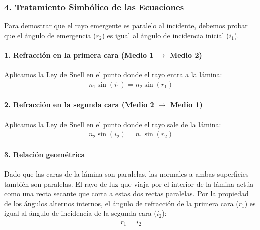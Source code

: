 \subsubsection*{4. Tratamiento Simbólico de las Ecuaciones}
Para demostrar que el rayo emergente es paralelo al incidente, debemos probar que el ángulo de emergencia ($r_2$) es igual al ángulo de incidencia inicial ($i_1$).

\paragraph*{1. Refracción en la primera cara (Medio 1 $\to$ Medio 2)}
Aplicamos la Ley de Snell en el punto donde el rayo entra a la lámina:
\begin{gather}
    n_1 \sin(i_1) = n_2 \sin(r_1) \label{eq:snell1}
\end{gather}

\paragraph*{2. Refracción en la segunda cara (Medio 2 $\to$ Medio 1)}
Aplicamos la Ley de Snell en el punto donde el rayo sale de la lámina:
\begin{gather}
    n_2 \sin(i_2) = n_1 \sin(r_2) \label{eq:snell2}
\end{gather}

\paragraph*{3. Relación geométrica}
Dado que las caras de la lámina son paralelas, las normales a ambas superficies también son paralelas. El rayo de luz que viaja por el interior de la lámina actúa como una recta secante que corta a estas dos rectas paralelas. Por la propiedad de los ángulos alternos internos, el ángulo de refracción de la primera cara ($r_1$) es igual al ángulo de incidencia de la segunda cara ($i_2$):
\begin{gather}
    r_1 = i_2 \label{eq:geometria}
\end{gather}

